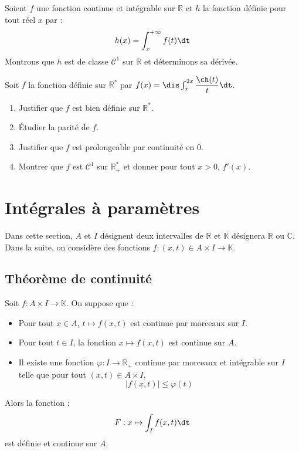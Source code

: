 \documentclass[a4paper,10pt]{report}
\begin{document}
\medskip

\begin{ex} Soient $f$ une fonction continue et intégrable sur $\mathbb{R}$ et $h$ la fonction définie pour tout réel $x$ par :
$$ h(x) = \int_x^{+ \infty} f(t) \dt$$
Montrons que $h$ est de classe $\mathcal{C}^1$ sur $\mathbb{R}$ et déterminons sa dérivée.



\vspace{11.5cm}
\end{ex}

\begin{exa} Soit $f$ la fonction définie sur $\mathbb{R}^*$ par $f(x) = \dis \int_{x}^{2x} \dfrac{\ch(t)}{t} \dt$.

\begin{enumerate}
\item Justifier que $f$ est bien définie sur $\mathbb{R}^*$. 
\item Étudier la parité de $f$. 
\item Justifier que $f$ est prolongeable par continuité en $0$.
\item Montrer que $f$ est $\mathcal{C}^1$ sur $\mathbb{R}_+^{*}$ et donner pour tout $x>0$, $f'(x)$.
\end{enumerate}
\end{exa}

\section{Intégrales à paramètres}

\noindent Dans cette section, $A$ et $I$ désignent deux intervalles de $\mathbb{R}$ et $\mathbb{K}$ désignera $\mathbb{R}$ ou $\mathbb{C}$. Dans la suite, on considère des fonctions $f : (x,t) \in A \times I \rightarrow \mathbb{K}$.

\subsection{Théorème de continuité}

\begin{thm}

\noindent Soit $f : A \times I \rightarrow \mathbb{K}$. On suppose que :
\begin{itemize}
\item Pour tout $x \in A$, $t \mapsto f(x,t)$ est continue par morceaux sur $I$.
\item Pour tout $t \in I$, la fonction $x \mapsto f(x,t)$ est continue sur $A$.
\item Il existe une fonction $\varphi : I \rightarrow \mathbb{R}_+$ continue par morceaux et intégrable sur $I$ telle que pour tout $(x,t) \in A \times I$,
$$ \vert f(x,t) \vert \leq \varphi(t)$$
\end{itemize}
Alors la fonction :
$$ F : x \mapsto \int_{I} f(x,t) \dt$$
est définie et continue sur $A$.
\end{thm}
\end{document}
